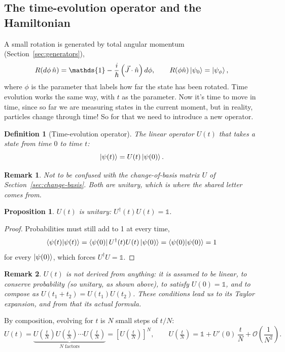 \documentclass{article}
\newtheorem{definition}{Definition}
\newtheorem{remark}{Remark}
\newtheorem{proposition}{Proposition}
\newcommand{\id}{\mathds{1}}
\begin{document}
\subsection{The time-evolution operator and the Hamiltonian}
A small rotation is generated by total angular momentum (Section~\ref{sec:generators}),
\[R(d\phi\,\hat{n}) = \id - \frac{i}{\hbar}\left(\vec{J}\cdot\hat{n}\right)d\phi, \qquad R(\phi\hat{n})\ket{\psi_0} = \ket{\psi_\phi},\]
where $\phi$ is the parameter that labels how far the state has been rotated. Time evolution works the same way, with $t$ as the parameter.
Now it's time to move in time, since so far we are measuring states in the current moment, but in reality, particles change through time! So for that we need to introduce a new operator.
\begin{definition}[Time-evolution operator]
    The linear operator $U(t)$ that takes a state from time $0$ to time $t$:
    \begin{equation}
        \ket{\psi(t)} = U(t)\ket{\psi(0)}.
    \end{equation}
\end{definition}
\begin{remark}
    Not to be confused with the change-of-basis matrix $U$ of Section~\ref{sec:change-basis}. Both are unitary, which is where the shared letter comes from.
\end{remark}
\begin{proposition}
    $U(t)$ is unitary: $U^\dagger(t)U(t) = \id$.
\end{proposition}
\begin{proof}
    Probabilities must still add to 1 at every time,
    \[\braket{\psi(t)|\psi(t)} = \bra{\psi(0)}U^\dagger(t)U(t)\ket{\psi(0)} = \braket{\psi(0)|\psi(0)} = 1\]
    for every $\ket{\psi(0)}$, which forces $U^\dagger U = \id$.
\end{proof}
\begin{remark}
    $U(t)$ is not derived from anything: it is assumed to be linear, to conserve probability (so unitary, as shown above), to satisfy $U(0) = \id$, and to compose as $U(t_1 + t_2) = U(t_1)U(t_2)$. These conditions lead us to its Taylor expansion, and from that its actual formula.
\end{remark}
By composition, evolving for $t$ is $N$ small steps of $t/N$:
\[U(t) = \underbrace{U\!\left(\tfrac{t}{N}\right)U\!\left(\tfrac{t}{N}\right)\cdots U\!\left(\tfrac{t}{N}\right)}_{N \text{ factors}} = \left[U\!\left(\tfrac{t}{N}\right)\right]^N, \qquad U\!\left(\tfrac{t}{N}\right) = \id + U'(0)\,\frac{t}{N} + \mathcal{O}\!\left(\frac{1}{N^2}\right).\]
\end{document}
